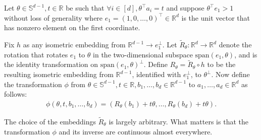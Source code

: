 \documentclass{article}\usepackage[a4paper,margin=20mm]{geometry}
\newcommand{\R}{\mathbb R}
\newcommand{\T}{\top}
\begin{document}
\begin{definition}\label{def:change-of-variables}
    Let $\theta\in \mathbb{S}^{d-1}, t\in \R$
    be such that $\forall i\in [d], \theta^\top a_i = t$ and suppose $\theta^\T e_1 > 1$ without loss of generality where $e_1 = (1, 0, \ldots, 0)^\top \in \R^d$ is the unit vector that has nonzero element on the first coordinate.
    
    Fix $h$ as any isometric embedding from $\R^{d-1} \to e_1^\perp$.
    Let $\tilde{R}_{\theta}: \R^d \to \R^d$ denote the rotation
    that rotates $e_1$ to $\theta$ in the two-dimensional subspace
    $\mathrm{span}(e_1, \theta)$, and is the identity transformation on $\mathrm{span}(e_1, \theta)^\perp$.
    Define $R_{\theta} = \tilde{R}_{\theta} \circ h$ to be the resulting
    isometric embedding from $\R^{d-1}$, identified with $e_1^\perp$, to $\theta^\perp$.
    Now define the transformation $\phi$ from $\theta\in \mathbb{S}^{d-1}, t \in \R, b_1,\ldots,b_d\in \R^{d-1}$ to $a_1,\ldots, a_d \in \R^d$ as follows:
    \begin{align}\label{eq:change-of-variables}
        \phi(\theta, t, b_1,\ldots,b_d) = (R_{\theta}(b_1) + t\theta, \ldots, R_{\theta}(b_d) + t\theta).%
    \end{align}
\end{definition}

The choice of the embeddings $\tilde R_\theta$ is largely arbitrary.
What matters is that the transformation $\phi$ and its inverse are continuous almost everywhere.
\end{document}
